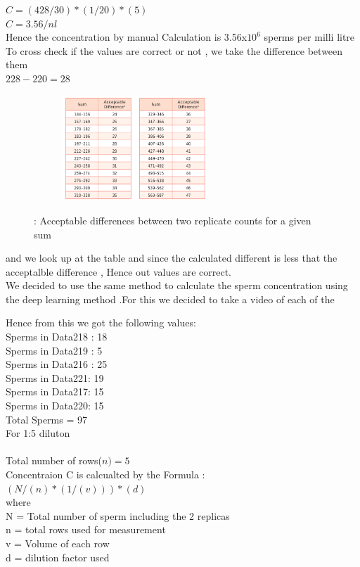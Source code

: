 \documentclass{article}
\begin{document}
$C = (428/30)*(1/20)*(5) $ \\
$C = 3.56/nl$ \\
Hence the concentration by manual Calculation is 3.56x$10^6$ sperms per milli litre
\\
To cross check if the values are correct or not , we take the difference between them \\
$228 - 220 = 28$ \\
\begin{figure}[H]
  \centering
  \begin{subfigure}{5.5cm}
    \centering\includegraphics[width=5.5cm]{table.png}
  \end{subfigure}
  \caption{: Acceptable differences between two replicate counts for a given sum}
 \label{fig:gradcam}
\end{figure}
and we look up at the table and since the calculated different is less that the acceptalble difference , Hence
out values are correct. \\
We decided to use the same method to calculate the sperm concentration using the deep learning method .For this we decided to take a video of each of the 



Hence from this we got the following values: \\
Sperms in Data218 : 18 \\
Sperms in Data219 : 5 \\
Sperms in Data216 : 25 \\
Sperms in Data221: 19 \\
Sperms in Data217: 15 \\
Sperms in Data220: 15 \\
Total Sperms = 97 \\

For 1:5 diluton \\ \\
Total number of rows($n)= 5$ \\ 

Concentraion C is calcualted by the Formula : \\
$(N/(n)*(1/(v)))*(d)$ \\
where \\
N = Total number of sperm including the 2 replicas \\
n = total rows used for measurement \\
v = Volume of each row \\
d = dilution factor used \\
\end{document}
